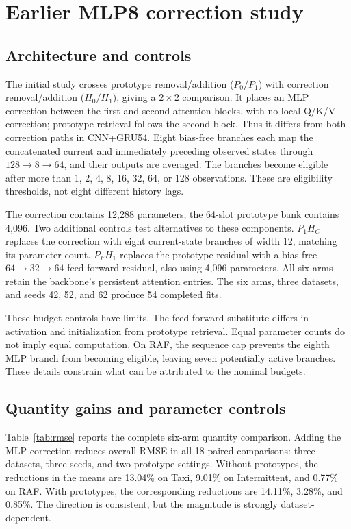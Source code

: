 \documentclass[runningheads]{llncs}
\begin{document}
\clearpage
\section{Earlier MLP8 correction study}
\label{app:metrics}
\subsection{Architecture and controls}
The initial study crosses prototype removal/addition ($P_0/P_1$) with correction removal/addition ($H_0/H_1$), giving a $2\times2$ comparison. It places an MLP correction between the first and second attention blocks, with no local Q/K/V correction; prototype retrieval follows the second block. Thus it differs from both correction paths in CNN+GRU54. Eight bias-free branches each map the concatenated current and immediately preceding observed states through $128\!\to\!8\!\to\!64$, and their outputs are averaged. The branches become eligible after more than 1, 2, 4, 8, 16, 32, 64, or 128 observations. These are eligibility thresholds, not eight different history lags.

The correction contains 12,288 parameters; the 64-slot prototype bank contains 4,096. Two additional controls test alternatives to these components. $P_1H_C$ replaces the correction with eight current-state branches of width 12, matching its parameter count. $P_FH_1$ replaces the prototype residual with a bias-free $64\!\to\!32\!\to\!64$ feed-forward residual, also using 4,096 parameters. All six arms retain the backbone's persistent attention entries. The six arms, three datasets, and seeds 42, 52, and 62 produce 54 completed fits.

These budget controls have limits. The feed-forward substitute differs in activation and initialization from prototype retrieval. Equal parameter counts do not imply equal computation. On RAF, the sequence cap prevents the eighth MLP branch from becoming eligible, leaving seven potentially active branches. These details constrain what can be attributed to the nominal budgets.


\subsection{Quantity gains and parameter controls}
Table~\ref{tab:rmse} reports the complete six-arm quantity comparison. Adding the MLP correction reduces overall RMSE in all 18 paired comparisons: three datasets, three seeds, and two prototype settings. Without prototypes, the reductions in the means are 13.04\% on Taxi, 9.01\% on Intermittent, and 0.77\% on RAF. With prototypes, the corresponding reductions are 14.11\%, 3.28\%, and 0.85\%. The direction is consistent, but the magnitude is strongly dataset-dependent.
\end{document}
